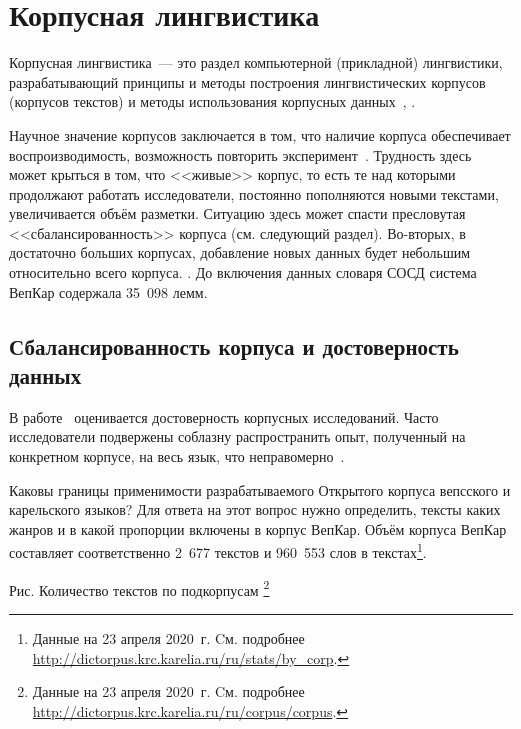 \section{Корпусная лингвистика} \label{sect_review_corpus_linguistics}

Корпусная лингвистика~--- это раздел компьютерной (прикладной) лингвистики, разрабатывающий принципы и методы  
построения лингвистических корпусов (корпусов текстов)
и методы использования корпусных данных~\cite[с.~3]{Zakharov2005}, \cite[с.~407]{Kibrik2019}.

Научное значение корпусов заключается в том, что наличие корпуса обеспечивает воспроизводимость, возможность повторить эксперимент~\cite[с.~409]{Kibrik2019}. Трудность здесь может крыться в том, что <<живые>> корпус, то есть те над которыми продолжают работать исследователи, постоянно пополняются новыми текстами, увеличивается объём разметки. Ситуацию здесь может спасти пресловутая <<сбалансированность>> корпуса (см. следующий раздел). 
Во-вторых, в достаточно больших корпусах, добавление новых данных будет небольшим относительно всего корпуса. .
До включения данных словаря СОСД система ВепКар содержала 35~098 лемм.

\subsection{Сбалансированность корпуса и достоверность данных}

В работе~\cite{Belikov2013}
оценивается достоверность корпусных исследований. 
Часто исследователи подвержены соблазну распространить опыт, полученный на конкретном корпусе, 
на весь язык, что неправомерно~\cite{Belikov2013}.

Каковы границы применимости разрабатываемого Открытого корпуса вепсского и карельского языков? 
Для ответа на этот вопрос нужно определить, тексты каких жанров и в какой пропорции включены в корпус ВепКар. 
Объём корпуса ВепКар составляет соответственно 2~677 текстов и 960~553 слов в текстах\footnote{ Данные на 23 апреля 2020~г. Cм. подробнее 
\href{http://dictorpus.krc.karelia.ru/ru/stats/by\_corp}{http://dictorpus.krc.karelia.ru/ru/stats/by\_corp}.}.


Рис. Количество текстов по подкорпусам
\footnote{ Данные на 23 апреля 2020~г. Cм. подробнее 
\href{http://dictorpus.krc.karelia.ru/ru/corpus/corpus}{http://dictorpus.krc.karelia.ru/ru/corpus/corpus}.}

